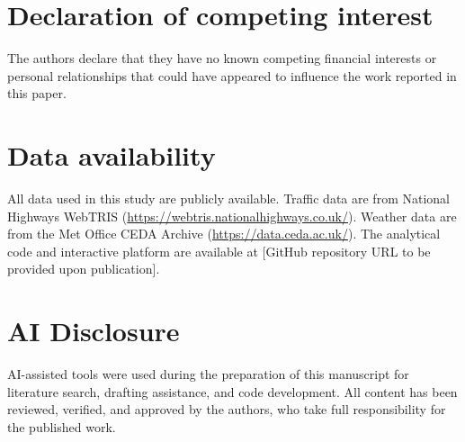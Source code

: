 \documentclass[review]{elsarticle}
\begin{document}
\section*{Declaration of competing interest}

The authors declare that they have no known competing financial interests or personal relationships that could have appeared to influence the work reported in this paper.

\section*{Data availability}

All data used in this study are publicly available. Traffic data are from National Highways WebTRIS (\url{https://webtris.nationalhighways.co.uk/}). Weather data are from the Met Office CEDA Archive (\url{https://data.ceda.ac.uk/}). The analytical code and interactive platform are available at [GitHub repository URL to be provided upon publication].

\section*{AI Disclosure}

AI-assisted tools were used during the preparation of this manuscript for literature search, drafting assistance, and code development. All content has been reviewed, verified, and approved by the authors, who take full responsibility for the published work.




\end{document}

